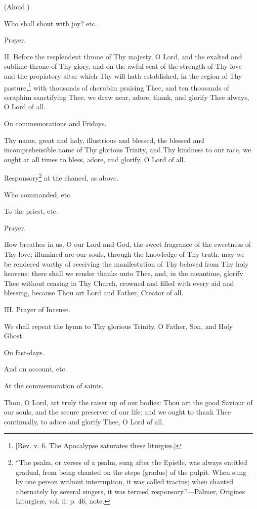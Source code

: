 (Aloud.)

Who shall shout with joy? etc.

Prayer.

II. Before the resplendent throne of Thy majesty, O Lord, and the exalted and sublime throne of Thy glory, and on the awful seat of the strength of Thy love and the propiatory altar which Thy will hath established, in the region of Thy pasture,\footnote{\par{}  [Rev. v. 6. The Apocalypse saturates these liturgies.]} with thousands of cherubim praising Thee, and ten thousands of seraphim sanctifying Thee, we draw near, adore, thank, and glorify Thee always, O Lord of all.

On commemorations and Fridays.

Thy name, great and holy, illustrious and blessed, the blessed and incomprehensible name of Thy glorious Trinity, and Thy kindness to our race, we ought at all times to bless, adore, and glorify, O Lord of all.

Responsory\footnote{\par  “The psalm, or verses of a psalm, sung after the Epistle, was always entitled gradual, from being chanted on the steps (gradus) of the pulpit. When sung by one person without interruption, it was called tractus; when chanted alternately by several singers, it was termed responsory.”—Palmer, Origines Liturgicæ, vol. ii. p. 46, note.} at the chancel, as above.

Who commanded, etc.

To the priest, etc.

Prayer.

How breathes in us, O our Lord and God, the sweet fragrance of the sweetness of Thy love; illumined are our souls, through the knowledge of Thy truth: may we be rendered worthy of receiving the manifestation of Thy beloved from Thy holy heavens: there shall we render thanks unto Thee, and, in the meantime, glorify Thee without ceasing in Thy Church, crowned and filled with every aid and blessing, because Thou art Lord and Father, Creator of all.

III. Prayer of Incense.

We shall repeat the hymn to Thy glorious Trinity, O Father, Son, and Holy Ghost.

On fast-days.

And on account, etc.

At the commemoration of saints.

Thou, O Lord, art truly the raiser up of our bodies: Thou art the good Saviour of our souls, and the secure preserver of our life; and we ought to thank Thee continually, to adore and glorify Thee, O Lord of all.

